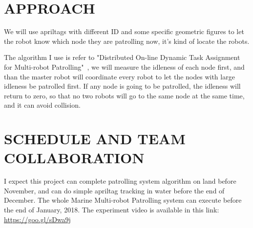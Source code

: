 \documentclass[letterpaper, 10 pt, conference]{ieeeconf}  %
\begin{document}
\section{APPROACH}

We will use apriltags with different ID and some specific geometric figures to let the robot know which node they are patrolling now, it's kind of locate the robots.

The algorithm I use is refer to "Distributed On-line Dynamic Task Assignment for Multi-robot Patrolling"~\cite{Farinelli:2017:DOD:3124264.3124274}, we will measure the idleness of each node first, and than the master robot will coordinate every robot to let the nodes with large idleness be patrolled first. If any node is going to be patrolled, the idleness will return to zero, so that no two robots will go to the same node at the same time, and it can avoid collision.   


\section{SCHEDULE AND TEAM COLLABORATION}

I expect this project can complete patrolling system algorithm on land before November, and can do simple apriltag tracking in water before the end of December. The whole Marine Multi-robot Patrolling system can execute before the end of January, 2018. The experiment video is available in this link: \url{https://goo.gl/sDwa9j}

\addtolength{\textheight}{-12cm}   %



\end{document}
